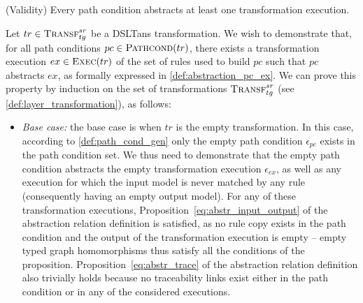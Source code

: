\begin{proposition}{(Validity)}
\label{prop:pc_validity}
Every path condition abstracts at least one transformation execution.
\end{proposition}
\begin{ps}

Let $tr\in \textsc{Transf}^{sr}_{tg}$ be a DSLTans transformation. We wish to demonstrate that, for all path conditions $pc\in \textsc{Pathcond}(tr)$, there exists a transformation execution $ex\in \textsc{Exec}(tr)$ of the set of
rules used to build $pc$ such that $pc$ abstracts $ex$, as formally expressed in \cref{def:abstraction_pc_ex}. We can prove this property by induction on the set of transformations $\textsc{Transf}^{sr}_{tg}$ (see \cref{def:layer_transformation}), as follows:

\begin{itemize}
  \item \emph{Base case:} the base case is when $tr$ is the empty
  transformation. In this case, according to \cref{def:path_cond_gen} only the
  empty path condition $\epsilon_{pc}$ exists in the path condition set. We thus
  need to demonstrate that the empty path condition abstracts the empty
  transformation execution $\epsilon_{ex}$, as well as any execution for which
  the input model is never matched by any rule (consequently having an empty
  output model). For any of these transformation executions, Proposition~\ref{eq:abstr_input_output} of the abstraction relation definition is satisfied, as no rule copy exists in the path condition and the output of the transformation execution is empty -- empty typed graph homomorphisms thus satisfy all the conditions of the proposition. Proposition~\ref{eq:abstr_trace} of the abstraction relation definition also trivially holds because no traceability links exist either in the path condition or in any of the considered executions.
  
 

\end{itemize}
\end{ps}

